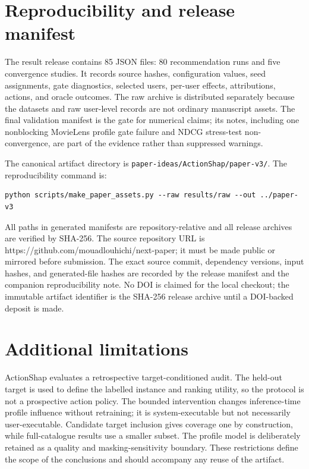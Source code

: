 \documentclass[pdflatex,sn-basic,Numbered]{sn-jnl}
\theoremstyle{thmstyleone}
\theoremstyle{thmstyletwo}
\theoremstyle{thmstylethree}
\begin{document}
\begin{appendices}
\section{Reproducibility and release manifest}\label{app:release}

The result release contains 85 JSON files: 80 recommendation runs and five convergence studies. It records source hashes, configuration values, seed assignments, gate diagnostics, selected users, per-user effects, attributions, actions, and oracle outcomes. The raw archive is distributed separately because the datasets and raw user-level records are not ordinary manuscript assets. The final validation manifest is the gate for numerical claims; its notes, including one nonblocking MovieLens profile gate failure and NDCG stress-test non-convergence, are part of the evidence rather than suppressed warnings.

The canonical artifact directory is \texttt{paper-ideas/ActionShap/paper-v3/}. The reproducibility command is:
\begin{verbatim}
python scripts/make_paper_assets.py --raw results/raw --out ../paper-v3
\end{verbatim}
All paths in generated manifests are repository-relative and all release archives are verified by SHA-256. The source repository URL is https://github.com/mouadlouhichi/next-paper; it must be made public or mirrored before submission. The exact source commit, dependency versions, input hashes, and generated-file hashes are recorded by the release manifest and the companion reproducibility note. No DOI is claimed for the local checkout; the immutable artifact identifier is the SHA-256 release archive until a DOI-backed deposit is made.

\section{Additional limitations}\label{app:limitations}

ActionShap evaluates a retrospective target-conditioned audit. The held-out target is used to define the labelled instance and ranking utility, so the protocol is not a prospective action policy. The bounded intervention changes inference-time profile influence without retraining; it is system-executable but not necessarily user-executable. Candidate target inclusion gives coverage one by construction, while full-catalogue results use a smaller subset. The profile model is deliberately retained as a quality and masking-sensitivity boundary. These restrictions define the scope of the conclusions and should accompany any reuse of the artifact.

\end{appendices}
\end{document}
